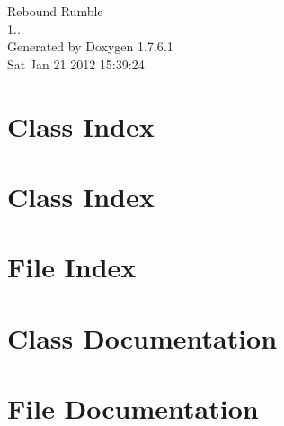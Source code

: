 \documentclass[a4paper]{book}
\begin{document}
\hypersetup{pageanchor=false,citecolor=blue}
\begin{titlepage}
\vspace*{7cm}
\begin{center}
{\Large \-Rebound \-Rumble \\[1ex]\large 1.. }\\
\vspace*{1cm}
{\large \-Generated by Doxygen 1.7.6.1}\\
\vspace*{0.5cm}
{\small Sat Jan 21 2012 15:39:24}\\
\end{center}
\end{titlepage}
\clearemptydoublepage
{}
\tableofcontents
\clearemptydoublepage
{}
\hypersetup{pageanchor=true,citecolor=blue}
\chapter{\-Class \-Index}

\chapter{\-Class \-Index}

\chapter{\-File \-Index}

\chapter{\-Class \-Documentation}














\chapter{\-File \-Documentation}











































\printindex
\end{document}
